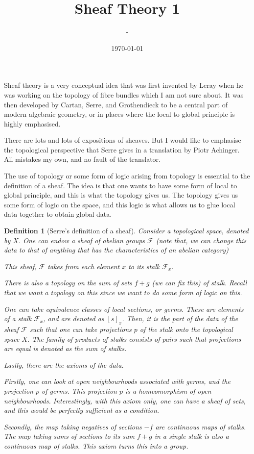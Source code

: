 \documentclass[12pt]{article}
\title{Sheaf Theory 1}
\author{-}
\date{\today}
\newtheorem{definition}{Definition}
\begin{document}
\maketitle

Sheaf theory is a very conceptual idea that was first invented by Leray when he was working on the topology of fibre bundles which I am not sure about. It was then developed by Cartan, Serre, and Grothendieck to be a central part of modern algebraic geometry, or in places where the local to global principle is highly emphasised.

There are lots and lots of expositions of sheaves. But I would like to emphasise the topological perspective that Serre gives in a translation by Piotr Achinger. All mistakes my own, and no fault of the translator.

The use of topology or some form of logic arising from topology is essential to the definition of a sheaf. The idea is that one wants to have some form of local to global principle, and this is what the topology gives us. The topology gives us some form of logic on the space, and this logic is what allows us to glue local data together to obtain global data.

\begin{definition}[Serre's definition of a sheaf]
    Consider a topological space, denoted by $X$. One can endow a sheaf of abelian groups $\mathcal{F}$ (note that, we can change this data to that of anything that has the characteristics of an abelian category)

    This sheaf, $\mathcal{F}$ takes from each element $x$ to its stalk $\mathcal{F}_x$.

    There is also a topology on the sum of sets $f + g$ (we can fix this) of stalk. Recall that we want a topology on this since we want to do some form of logic on this.

    One can take equivalence classes of local sections, or germs. These are elements of a stalk $\mathcal{F}_x$, and are denoted as $[s]_x$. Then, it is the part of the data of the sheaf $\mathcal{F}$ such that one can take projections $p$ of the stalk onto the topological space $X$. The family of products of stalks consists of pairs such that projections are equal is denoted as the sum of stalks.

    Lastly, there are the axioms of the data.
    
    Firstly, one can look at open neighbourhoods associated with germs, and the projection $p$ of germs. This projection $p$ is a homeomorphism of open neighbourhoods. Interestingly, with this axiom only, one can have a sheaf of sets, and this would be perfectly sufficient as a condition.

    Secondly, the map taking negatives of sections $-f$ are continuous maps of stalks. The map taking sums of sections to its sum $f + g$ in a single stalk is also a continuous map of stalks. This axiom turns this into a group.
\end{definition}
\end{document}
